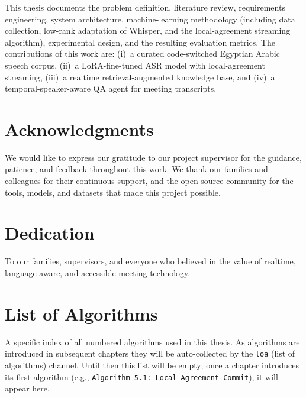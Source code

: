 \documentclass[12pt,a4paper,oneside]{book}
\newcounter{algorithm}
\theoremstyle{plain}
\theoremstyle{definition}
\theoremstyle{remark}
\begin{document}
This thesis documents the problem definition, literature review, requirements
engineering, system architecture, machine-learning methodology (including
data collection, low-rank adaptation of Whisper, and the local-agreement
streaming algorithm), experimental design, and the resulting evaluation
metrics. The contributions of this work are: (i)~a curated code-switched
Egyptian Arabic speech corpus, (ii)~a LoRA-fine-tuned ASR model with
local-agreement streaming, (iii)~a realtime retrieval-augmented knowledge
base, and (iv)~a temporal-speaker-aware QA agent for meeting transcripts.

\chapter*{Acknowledgments}

We would like to express our gratitude to our project supervisor for the
guidance, patience, and feedback throughout this work. We thank our families
and colleagues for their continuous support, and the open-source community
for the tools, models, and datasets that made this project possible.

\chapter*{Dedication}

To our families, supervisors, and everyone who believed in the value of
realtime, language-aware, and accessible meeting technology.

\tableofcontents

\listoffigures
\listoftables

\chapter*{List of Algorithms}

A specific index of all numbered algorithms used in this thesis. As
algorithms are introduced in subsequent chapters they will be
auto-collected by the \texttt{loa} (list of algorithms) channel. Until
then this list will be empty; once a chapter introduces its first
algorithm (e.g., \texttt{Algorithm 5.1: Local-Agreement Commit}), it
will appear here.
\end{document}
